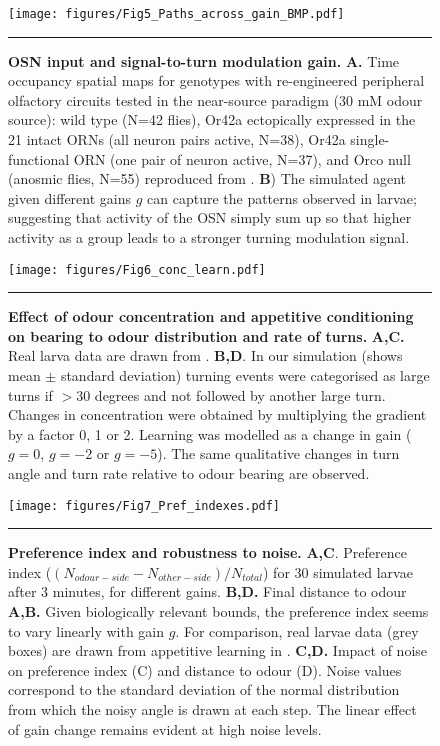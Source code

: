 \documentclass[11pt,a4paper]{article}
\newcommand{\todoBW}[1]{\todo[author=BW,color=orange, size=\tiny,inline]{#1}}
\begin{document}
\begin{figure}
\begin{center}
\texttt{[image: figures/Fig5\_Paths\_across\_gain\_BMP.pdf]}
\caption{{\bf OSN input and signal-to-turn modulation gain.}
{\bf A.} Time occupancy spatial maps for genotypes with re-engineered peripheral olfactory circuits tested in the near-source paradigm (30 mM odour source): wild type (N=42 flies), Or42a ectopically expressed in the 21 intact ORNs (all neuron pairs active, N=38), Or42a single-functional ORN (one pair of neuron active, N=37), and Orco null (anosmic flies, N=55) reproduced from \cite{gomez2011active}.
{\bf B}) The simulated agent given different gains $g$ can capture the patterns observed in larvae; suggesting that activity of the OSN simply sum up so that higher activity as a group leads to a stronger turning modulation signal.
\label{fig:OSN}}
\hrule
\end{center}
\end{figure}


\begin{figure}
\begin{center}
\texttt{[image: figures/Fig6\_conc\_learn.pdf]}
\caption{{\bf Effect of odour concentration and appetitive conditioning on bearing to odour distribution and rate of turns.} {\bf A,C.} Real larva data are drawn from \citep{schleyer2015learning}. {\bf B,D}. In our simulation (shows mean $\pm$ standard deviation) turning events were categorised as large turns if $>30$ degrees and not followed by another large turn. Changes in concentration were obtained by multiplying the gradient by a factor 0, 1 or 2. Learning was modelled as a change in gain ($g=0$, $g=-2$ or $g=-5$). The same qualitative changes in turn angle and turn rate relative to odour bearing are observed.
\label{fig:Concentration}}
\hrule
\end{center}
\end{figure}

\begin{figure}
\begin{center}
\texttt{[image: figures/Fig7\_Pref\_indexes.pdf]}
\caption{{\bf Preference index and robustness to noise. }
{\bf A,C}. Preference index ($(N_{odour-side}-N_{other-side})/N_{total}$) for 30 simulated larvae after 3 minutes, for different gains. {\bf B,D.} Final distance to odour 
{\bf A,B.} Given biologically relevant bounds, the preference index seems to vary linearly with  gain $g$. For comparison, real larvae data (grey boxes) are drawn from appetitive learning in \citep{schleyer2011behavior}.
{\bf C,D.} Impact of noise on preference index (C) and distance to odour (D). Noise values correspond to the standard deviation of the normal distribution from which the noisy angle is drawn at each step. The linear effect of gain change remains evident at high noise levels.
\label{fig:PreferenceIndex}}
\hrule
\end{center}
\end{figure}
\end{document}
